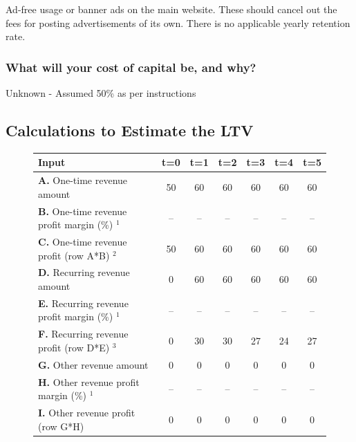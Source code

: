 \documentclass{article}
\begin{document}
        Ad-free usage or banner ads on the main website. These should cancel out the fees for posting advertisements of its own. There is no applicable yearly retention rate.

        \subsubsection{What will your cost of capital be, and why?} 
        Unknown - Assumed 50\% as per instructions

    \subsection{Calculations to Estimate the LTV}
        \begin{figure}[ht!]
            \begin{center}
                \begin{tabular}{| p{6.5cm} | c | c | c | c | c | c |}
                    \hline
                    \textbf{Input} & \textbf{t=0} & \textbf{t=1} & \textbf{t=2} & \textbf{t=3} & \textbf{t=4} & \textbf{t=5}
                    \\ \hline
                    \textbf{A.} One-time revenue amount & 50 & 60 & 60 & 60 & 60 &60  
                    \\ \hline
                    \textbf{B.} One-time revenue profit margin (\%) $^{1}$ & -- & -- & -- & -- & -- & -- 
                    \\ \hline
                    \textbf{C.} One-time revenue profit (row A*B) $^{2}$ & 50 & 60 & 60 & 60 & 60 &60  
                    \\ \hline
                    \textbf{D.} Recurring revenue amount & 0 & 60 & 60 & 60 & 60 &60  
                    \\ \hline
                    \textbf{E.} Recurring revenue profit margin (\%) $^{1}$ & -- & -- & -- & -- & -- & -- 
                    \\ \hline
                    \textbf{F.} Recurring revenue profit (row D*E) $^{3}$& 0 & 30 & 30 & 27 & 24 & 27
                    \\ \hline
                    \textbf{G.} Other revenue amount & 0 & 0 & 0 & 0 & 0 & 0
                    \\ \hline
                    \textbf{H.} Other revenue profit margin (\%) $^{1}$ & -- & -- & -- & -- & -- & -- 
                    \\ \hline
                    \textbf{I.} Other revenue profit (row G*H) & 0 & 0 & 0 & 0 & 0 & 0

\end{tabular}
\end{center}
\end{figure}
\end{document}
